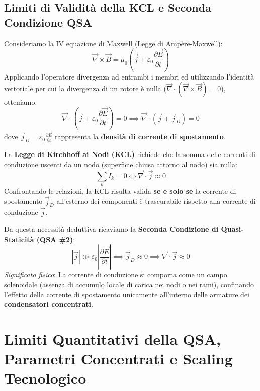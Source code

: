 \documentclass[12pt, a4paper]{report}
\begin{document}
\subsection{Limiti di Validità della KCL e Seconda Condizione QSA}
Consideriamo la IV equazione di Maxwell (Legge di Ampère-Maxwell):
\begin{equation}
    \vec{\nabla} \times \vec{B} = \mu_0 \left( \vec{j} + \varepsilon_0 \frac{\partial \vec{E}}{\partial t} \right)
\end{equation}
Applicando l'operatore divergenza ad entrambi i membri ed utilizzando l'identità vettoriale per cui la divergenza di un rotore è nulla ($\vec{\nabla} \cdot (\vec{\nabla} \times \vec{B}) = 0$), otteniamo:
\begin{equation}
    \vec{\nabla} \cdot \left( \vec{j} + \varepsilon_0 \frac{\partial \vec{E}}{\partial t} \right) = 0 \implies \vec{\nabla} \cdot \left( \vec{j} + \vec{j}_D \right) = 0
\end{equation}
dove $\vec{j}_D = \varepsilon_0 \frac{\partial \vec{E}}{\partial t}$ rappresenta la \textbf{densità di corrente di spostamento}.

La \textbf{Legge di Kirchhoff ai Nodi (KCL)} richiede che la somma delle correnti di conduzione uscenti da un nodo (superficie chiusa attorno al nodo) sia nulla:
\begin{equation}
    \sum_{k} I_k = 0 \iff \vec{\nabla} \cdot \vec{j} \approx 0
\end{equation}
Confrontando le relazioni, la KCL risulta valida \textbf{se e solo se} la corrente di spostamento $\vec{j}_D$ all'esterno dei componenti è trascurabile rispetto alla corrente di conduzione $\vec{j}$.

Da questa necessità deduttiva ricaviamo la \textbf{Seconda Condizione di Quasi-Staticità (QSA \#2)}:
\begin{equation}
    |\vec{j}| \gg \varepsilon_0 \left| \frac{\partial \vec{E}}{\partial t} \right| \implies \vec{j}_D \approx 0 \implies \vec{\nabla} \cdot \vec{j} \approx 0
\end{equation}
\textit{Significato fisico}: La corrente di conduzione si comporta come un campo solenoidale (assenza di accumulo locale di carica nei nodi o nei rami), confinando l'effetto della corrente di spostamento unicamente all'interno delle armature dei \textbf{condensatori concentrati}.

\section{Limiti Quantitativi della QSA, Parametri Concentrati e Scaling Tecnologico}
\end{document}
